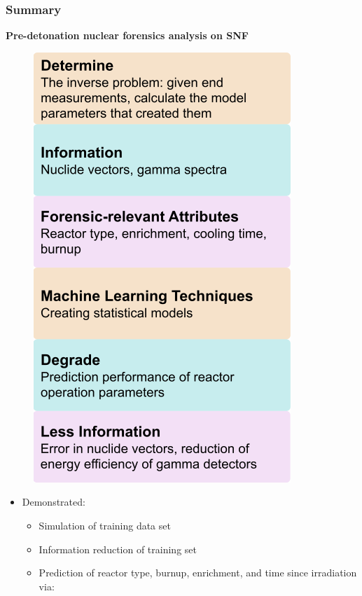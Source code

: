 \begin{frame}
  \frametitle{Summary}
  \begin{adjustwidth}{-10pt}{0pt}
  \textbf{Pre-detonation nuclear forensics analysis on SNF}\\
  \medskip
  \begin{minipage}{0.35\textwidth}
    \begin{figure}
      \centering
      \includegraphics[height=0.75\textheight]{./figures/overview.png}
    \end{figure}
  \end{minipage}%
  \hfill
  \begin{minipage}{0.65\textwidth}
  \begin{itemize}
    \item Demonstrated:
    \begin{itemize}
      \item Simulation of training data set
      \item Information reduction of training set
      \item Prediction of reactor type, burnup, enrichment, and time since irradiation via:

\end{itemize}
\end{itemize}
\end{minipage}
\end{adjustwidth}
\end{frame}
